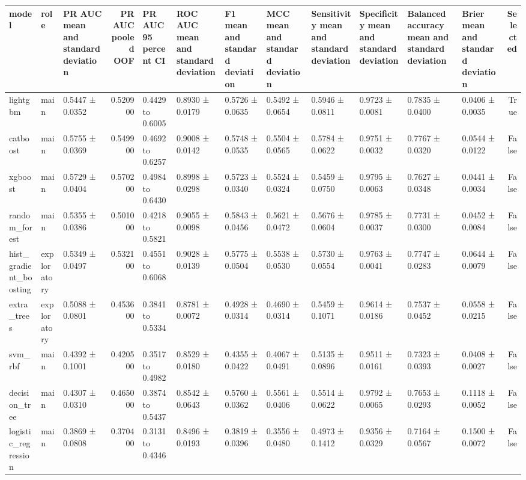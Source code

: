 \begin{tabular}{lllrllllllllr}
\toprule
model & role & PR AUC mean and standard deviation & PR AUC pooled OOF & PR AUC 95 percent CI & ROC AUC mean and standard deviation & F1 mean and standard deviation & MCC mean and standard deviation & Sensitivity mean and standard deviation & Specificity mean and standard deviation & Balanced accuracy mean and standard deviation & Brier mean and standard deviation & Selected \\
\midrule
lightgbm & main & 0.5447 ± 0.0352 & 0.520900 & 0.4429 to 0.6005 & 0.8930 ± 0.0179 & 0.5726 ± 0.0635 & 0.5492 ± 0.0654 & 0.5946 ± 0.0811 & 0.9723 ± 0.0081 & 0.7835 ± 0.0400 & 0.0406 ± 0.0035 & True \\
catboost & main & 0.5755 ± 0.0369 & 0.549900 & 0.4692 to 0.6257 & 0.9008 ± 0.0142 & 0.5748 ± 0.0535 & 0.5504 ± 0.0565 & 0.5784 ± 0.0622 & 0.9751 ± 0.0032 & 0.7767 ± 0.0320 & 0.0544 ± 0.0122 & False \\
xgboost & main & 0.5729 ± 0.0404 & 0.570200 & 0.4984 to 0.6430 & 0.8998 ± 0.0298 & 0.5723 ± 0.0340 & 0.5524 ± 0.0324 & 0.5459 ± 0.0750 & 0.9795 ± 0.0063 & 0.7627 ± 0.0348 & 0.0441 ± 0.0034 & False \\
random\_forest & main & 0.5355 ± 0.0386 & 0.501000 & 0.4218 to 0.5821 & 0.9055 ± 0.0098 & 0.5843 ± 0.0456 & 0.5621 ± 0.0472 & 0.5676 ± 0.0604 & 0.9785 ± 0.0037 & 0.7731 ± 0.0300 & 0.0452 ± 0.0084 & False \\
hist\_gradient\_boosting & exploratory & 0.5349 ± 0.0497 & 0.532100 & 0.4551 to 0.6068 & 0.9028 ± 0.0139 & 0.5775 ± 0.0504 & 0.5538 ± 0.0530 & 0.5730 ± 0.0554 & 0.9763 ± 0.0041 & 0.7747 ± 0.0283 & 0.0644 ± 0.0079 & False \\
extra\_trees & exploratory & 0.5088 ± 0.0801 & 0.453600 & 0.3841 to 0.5334 & 0.8781 ± 0.0072 & 0.4928 ± 0.0314 & 0.4690 ± 0.0314 & 0.5459 ± 0.1071 & 0.9614 ± 0.0186 & 0.7537 ± 0.0452 & 0.0558 ± 0.0215 & False \\
svm\_rbf & main & 0.4392 ± 0.1001 & 0.420500 & 0.3517 to 0.4982 & 0.8529 ± 0.0180 & 0.4355 ± 0.0422 & 0.4067 ± 0.0491 & 0.5135 ± 0.0896 & 0.9511 ± 0.0161 & 0.7323 ± 0.0393 & 0.0408 ± 0.0027 & False \\
decision\_tree & main & 0.4307 ± 0.0310 & 0.465000 & 0.3874 to 0.5437 & 0.8542 ± 0.0643 & 0.5760 ± 0.0362 & 0.5561 ± 0.0406 & 0.5514 ± 0.0622 & 0.9792 ± 0.0065 & 0.7653 ± 0.0293 & 0.1118 ± 0.0052 & False \\
logistic\_regression & main & 0.3869 ± 0.0808 & 0.370400 & 0.3131 to 0.4346 & 0.8496 ± 0.0193 & 0.3819 ± 0.0396 & 0.3556 ± 0.0480 & 0.4973 ± 0.1412 & 0.9356 ± 0.0329 & 0.7164 ± 0.0567 & 0.1500 ± 0.0072 & False \\

\end{tabular}
